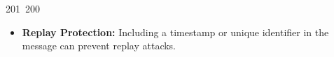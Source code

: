 201~200~\documentclass{article}
\begin{document}
\begin{itemize}
	                                                                                                                                                                                                                                                                                                	                                                                                                                                        	    	                                                                                                	                                                                                                                                                                                                                                                                                                                                	                                                                        	                                                                        	                                                                                                                                        	                                                                                                                                                                                                                        	                                                                                                                            	                                                                	                                                                                        \item \textbf{Replay Protection:} Including a timestamp or unique identifier in the message can prevent replay attacks.

\end{itemize}
\end{document}
